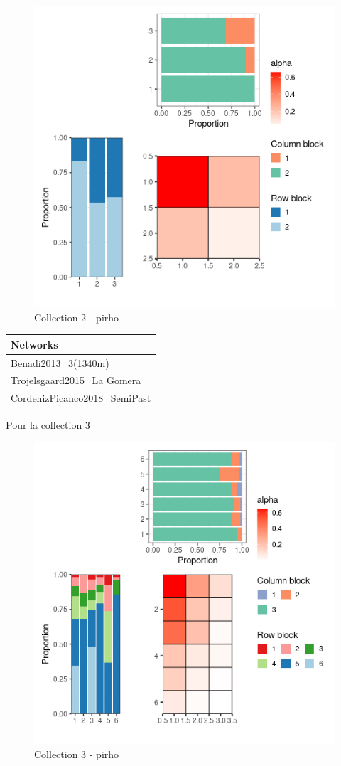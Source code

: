 \begin{figure}
\centering
\includegraphics{figure/pirho_meso_plot-2.png}
\caption{Collection 2 - pirho}
\end{figure}

\begin{longtable}[]{@{}l@{}}
\toprule
Networks\tabularnewline
\midrule
\endhead
Benadi2013\_3(1340m)\tabularnewline
Trojelsgaard2015\_La Gomera\tabularnewline
CordenizPicanco2018\_SemiPast\tabularnewline
\bottomrule
\end{longtable}

Pour la collection 3

\begin{figure}
\centering
\includegraphics{figure/pirho_meso_plot-3.png}
\caption{Collection 3 - pirho}
\end{figure}

